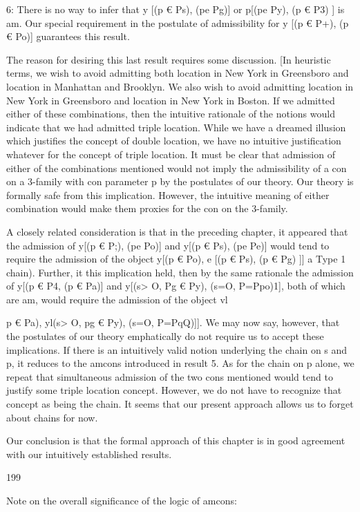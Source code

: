 \documentclass[10pt,twoside]{memoir}
\begin{document}
\begin{enumerate}
{\begin{enumerate}
\begin{sysrules}
\begin{sysrules}
\begin{sysrules}
\begin{sysrules}
{\begin{enumerate}
{{{{{{{{6: There is no way to infer that y [(p € Ps), (pe Pg)] or p[(pe Py), (p € P3) 
] is am. Our special requirement in the postulate of admissibility for y [(p € 
P+), (p € Po)] guarantees this result. 

The reason for desiring this last result requires some discussion. [In 
heuristic terms, we wish to avoid admitting both location in New York in 
Greensboro and location in Manhattan and Brooklyn. We also wish to avoid 
admitting location in New York in Greensboro and location in New York in 
Boston. If we admitted either of these combinations, then the intuitive 
rationale of the notions would indicate that we had admitted triple location. 
While we have a dreamed illusion which justifies the concept of double 
location, we have no intuitive justification whatever for the concept of triple 
location. It must be clear that admission of either of the combinations 
mentioned would not imply the admissibility of a con on a 3-family with 
con parameter p by the postulates of our theory. Our theory is formally safe 
from this implication. However, the intuitive meaning of either combination 
would make them proxies for the con on the 3-family. 

A closely related consideration is that in the preceding chapter, it 
appeared that the admission of y[(p € P;), (pe Po)] and y[(p € Ps), (pe Pe)] 
would tend to require the admission of the object y[(p € Po), e [(p € Ps), (p 
€ Pg) ]] {a Type 1 chain). Further, it this implication held, then by the same 
rationale the admission of y[(p € P4}, (p € Pa)] and y[(s> O, Pg € Py), (s=O, 
P=Ppo)1], both of which are am, would require the admission of the object 
vl{p € Pa), yl(s> O, pg € Py), (s=O, P=PqQ)]]. We may now say, however, 
that the postulates of our theory emphatically do not require us to accept 
these implications. If there is an intuitively valid notion underlying the chain 
on s and p, it reduces to the amcons introduced in result 5. As for the chain 
on p alone, we repeat that simultaneous admission of the two cons 
mentioned would tend to justify some triple location concept. However, we 
do not have to recognize that concept as being the chain. It seems that our 
present approach allows us to forget about chains for now. 

Our conclusion is that the formal approach of this chapter is in good 
agreement with our intuitively established results. 


199 


Note on the overall significance of the logic of amcons: 

}}}}}}}}}
\end{enumerate}}
\end{sysrules}
\end{sysrules}
\end{sysrules}
\end{sysrules}
\end{enumerate}}
\end{enumerate}
\end{document}
